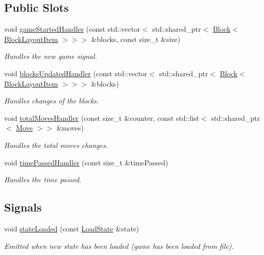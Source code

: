 \subsection*{Public Slots}
\begin{DoxyCompactItemize}
\item 
void \mbox{\hyperlink{class_state_manager_model_a414fe4dfa55aa139c26b3ccd002328ff}{game\+Started\+Handler}} (const std\+::vector$<$ std\+::shared\+\_\+ptr$<$ \mbox{\hyperlink{class_block}{Block}}$<$ \mbox{\hyperlink{class_block_layout_item}{Block\+Layout\+Item}} $>$$>$$>$ \&blocks, const size\+\_\+t \&size)
\begin{DoxyCompactList}\small\item\em Handles the new game signal. \end{DoxyCompactList}\item 
void \mbox{\hyperlink{class_state_manager_model_a51df218169f899e063572ca5df5a388b}{blocks\+Updated\+Handler}} (const std\+::vector$<$ std\+::shared\+\_\+ptr$<$ \mbox{\hyperlink{class_block}{Block}}$<$ \mbox{\hyperlink{class_block_layout_item}{Block\+Layout\+Item}} $>$$>$$>$ \&blocks)
\begin{DoxyCompactList}\small\item\em Handles changes of the blocks. \end{DoxyCompactList}\item 
void \mbox{\hyperlink{class_state_manager_model_a692ae20069405c9ace78f1d403046d8c}{total\+Moves\+Handler}} (const size\+\_\+t \&counter, const std\+::list$<$ std\+::shared\+\_\+ptr$<$ \mbox{\hyperlink{struct_move}{Move}} $>$$>$ \&moves)
\begin{DoxyCompactList}\small\item\em Handles the total moves changes. \end{DoxyCompactList}\item 
void \mbox{\hyperlink{class_state_manager_model_ab3f4c9b1d44a75c63c034e79f88ee9f0}{time\+Passed\+Handler}} (const size\+\_\+t \&time\+Passed)
\begin{DoxyCompactList}\small\item\em Handles the time passed. \end{DoxyCompactList}\end{DoxyCompactItemize}
\subsection*{Signals}
\begin{DoxyCompactItemize}
\item 
void \mbox{\hyperlink{class_state_manager_model_ade47748f618f84b0a2a32be1da177ad5}{state\+Loaded}} (const \mbox{\hyperlink{struct_load_state}{Load\+State}} \&state)
\begin{DoxyCompactList}\small\item\em Emitted when new state has been loaded (game has been loaded from file). \end{DoxyCompactList}\end{DoxyCompactItemize}

